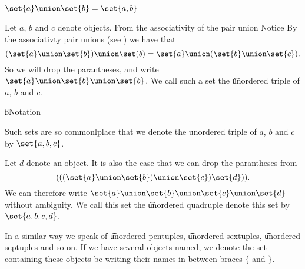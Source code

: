 

$\set{a} \union \set{b} = \set{a, b}$


Let $a$, $b$ and $c$ denote objects.
From the associativity of the pair union
Notice
By the associativty pair unions (see ) we have that
\[
  (\set{a} \union \set{b}) \union \set(b) = \set{a} \union (\set{b} \union \set{c}).
\]
So we will drop the parantheses, and write $\set{a} \union \set{b} \union \set{b}$.
We call such a set the \t{unordered triple} of $a$, $b$ and $c$.

\ss{Notation}

Such sets are so commonlplace that we denote the unordered triple of $a$, $b$ and $c$ by $\set{a, b, c}$.


Let $d$ denote an object.
It is also the case that we can drop the parantheses from
\[
  (((\set{a} \union \set{b}) \union \set{c}) \set{d})).
\]
We can therefore write $\set{a} \union \set{b} \union \set{c} \union \set{d}$ without ambiguity.
We call this set the \t{unordered quadruple} denote this set by $\set{a, b, c, d}$.

In a similar way we speak of \t{unordered pentuples}, \t{unordered sextuples}, \t{unordered septuples} and so on.
If we have several objects named, we denote the set containing these objects be writing their names in between braces $\{$ and $\}$.
